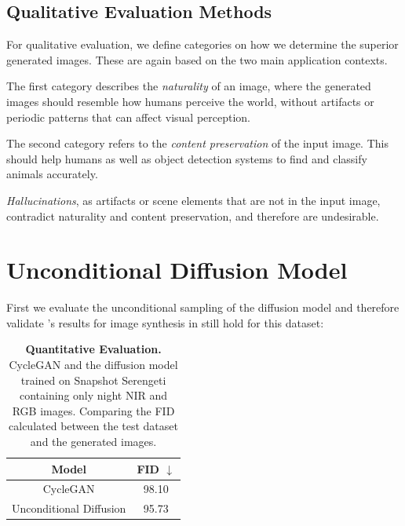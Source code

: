 
\label{sec:evaluate-fid}

\subsection{Qualitative Evaluation Methods}
For qualitative evaluation, we define categories on how we determine the superior generated images. These are again based on the two main application contexts.

The first category describes the \textit{naturality} of an image, where the generated images should resemble how humans perceive the world, without artifacts or periodic patterns that can affect visual perception.

The second category refers to the \textit{content preservation} of the input image. This should help humans as well as object detection systems to find and classify animals accurately.

\textit{Hallucinations}, as artifacts or scene elements that are not in the input image, contradict naturality and content preservation, and therefore are undesirable.

\section{Unconditional Diffusion Model}
First we evaluate the unconditional sampling of the diffusion model and therefore validate \parencite{diffusion-beats-gans}'s results for image synthesis in still hold for this dataset:

\begin{table}[htp!]
    \centering
    \begin{tabular}{c | c}
        Model                   & FID  $\downarrow$ \\
        \hline\hline
        CycleGAN                & 98.10             \\
        Unconditional Diffusion & 95.73
    \end{tabular}
    \caption{
        \textbf{Quantitative Evaluation.} CycleGAN and the diffusion model trained on Snapshot Serengeti \parencite{serengeti} containing only night NIR and RGB images.
        Comparing the FID calculated between the test dataset and the generated images.
    }
    \label{fig:quantitative-evaluation-unconditional-sampling}
\end{table}

